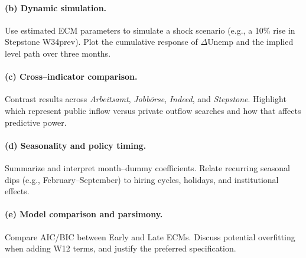 \documentclass[11pt,a4paper]{article}
\begin{document}
\paragraph{(b) Dynamic simulation.}
Use estimated ECM parameters to simulate a shock scenario (e.g., a 10\% rise in Stepstone W34prev).
Plot the cumulative response of $\Delta \text{Unemp}$ and the implied level path over three months.

\paragraph{(c) Cross–indicator comparison.}
Contrast results across \textit{Arbeitsamt}, \textit{Jobbörse}, \textit{Indeed}, and \textit{Stepstone}.
Highlight which represent public inflow versus private outflow searches and how that affects predictive power.

\paragraph{(d) Seasonality and policy timing.}
Summarize and interpret month–dummy coefficients.
Relate recurring seasonal dips (e.g., February–September) to hiring cycles, holidays, and institutional effects.

\paragraph{(e) Model comparison and parsimony.}
Compare AIC/BIC between Early and Late ECMs.
Discuss potential overfitting when adding W12 terms, and justify the preferred specification.
\end{document}
